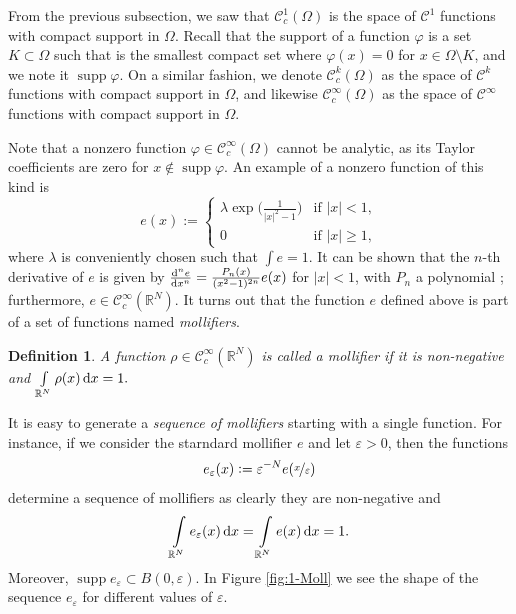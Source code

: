 \documentclass[a4paper,doc,11pt]{article}
\newtheorem{definition}[theorem]{Definition}
\newcommand{\R}{\mathbb{R}}
\newcommand{\CC}{\mathcal{C}}
\DeclareMathOperator{\supp}{supp}
\begin{document}
From the previous subsection, we saw that \(\CC_c^1 (\Omega)\) is the space of \(\CC^1\) functions with compact support in \(\Omega\). Recall that the support of a function \(\varphi\) is a set \( K \subset \Omega\) such that is the smallest compact set where \( \varphi (x) = 0\) for \( x\in \Omega \setminus K\), and we note it \(\supp \varphi\). On a similar fashion, we denote \(\CC_c^k (\Omega)\) as the space of \(\CC^k\) functions with compact support in \(\Omega\), and likewise \(\CC_c^\infty(\Omega)\) as the space of \(\CC^\infty\) functions with compact support in \(\Omega\).

Note that a nonzero function \(\varphi \in \CC_c^\infty (\Omega)\) cannot be analytic, as its Taylor coefficients are zero for \( x \notin \supp \varphi\). An example of a nonzero function of this kind is 
\[
    e(x) := 
    \begin{cases}
        \lambda \exp \Big( \frac{1}{|x|^2-1} \Big) & \text{if } |x| < 1,
        \\
        0   & \text{if } |x| \geq 1,
    \end{cases}
\]
where \(\lambda\) is conveniently chosen such that \( \int e = 1 \).
It can be shown that the \(n\)-th derivative of \(e\) is given by \( \od[n]{e}{x} = \frac{P_n(x)}{(x^2-1)^{2n}} e(x) \) for \( |x| < 1\), with \(P_n\) a polynomial \citep{Ball2019}; furthermore, \( e \in \CC_c^\infty (\R^N)\). 
It turns out that the function \(e\) defined above is part of a set of functions named \emph{mollifiers}. 

\begin{definition}
    A function \( \rho \in \CC_c^\infty(\R^N)\) is called a \emph{mollifier} if it is non-negative and 
    \(
        \int\limits_{\R^N} \rho(x) \dif x = 1.
    \)
\end{definition}

It is easy to generate a \emph{sequence of mollifiers} starting with a single function. For instance, if we consider the starndard mollifier \(e\) and let \(\varepsilon > 0\), then the functions
\[
    e_\varepsilon (x) := \varepsilon^{-N} e( \nicefrac x \varepsilon )
\]
determine a sequence of mollifiers as clearly they are non-negative and 
\[
    \int\limits_{\R^N} e_\varepsilon (x) \dif x = \int\limits_{\R^N} e(x) \dif x = 1.
\]
Moreover, \( \supp e_\varepsilon \subset B(0,\varepsilon) \). In Figure \ref{fig:1-Moll} we see the shape of the sequence \( e_\varepsilon\) for different values of \(\varepsilon\).
%
\end{document}
